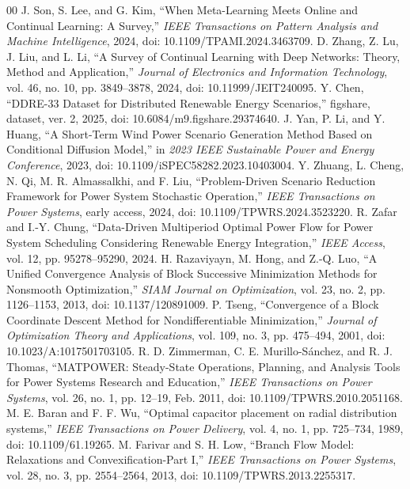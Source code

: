 \documentclass[journal]{IEEEtran}
\begin{document}
\begin{thebibliography}{00}
 J. Son, S. Lee, and G. Kim, ``When Meta-Learning Meets Online and Continual Learning: A Survey,'' \emph{IEEE Transactions on Pattern Analysis and Machine Intelligence}, 2024, doi: 10.1109/TPAMI.2024.3463709.
 D. Zhang, Z. Lu, J. Liu, and L. Li, ``A Survey of Continual Learning with Deep Networks: Theory, Method and Application,'' \emph{Journal of Electronics and Information Technology}, vol. 46, no. 10, pp. 3849--3878, 2024, doi: 10.11999/JEIT240095.
 Y. Chen, ``DDRE-33 Dataset for Distributed Renewable Energy Scenarios,'' figshare, dataset, ver. 2, 2025, doi: 10.6084/m9.figshare.29374640.
 J. Yan, P. Li, and Y. Huang, ``A Short-Term Wind Power Scenario Generation Method Based on Conditional Diffusion Model,'' in \emph{2023 IEEE Sustainable Power and Energy Conference}, 2023, doi: 10.1109/iSPEC58282.2023.10403004.
 Y. Zhuang, L. Cheng, N. Qi, M. R. Almassalkhi, and F. Liu, ``Problem-Driven Scenario Reduction Framework for Power System Stochastic Operation,'' \emph{IEEE Transactions on Power Systems}, early access, 2024, doi: 10.1109/TPWRS.2024.3523220.
 R. Zafar and I.-Y. Chung, ``Data-Driven Multiperiod Optimal Power Flow for Power System Scheduling Considering Renewable Energy Integration,'' \emph{IEEE Access}, vol. 12, pp. 95278--95290, 2024.
 H. Razaviyayn, M. Hong, and Z.-Q. Luo, ``A Unified Convergence Analysis of Block Successive Minimization Methods for Nonsmooth Optimization,'' \emph{SIAM Journal on Optimization}, vol. 23, no. 2, pp. 1126--1153, 2013, doi: 10.1137/120891009.
 P. Tseng, ``Convergence of a Block Coordinate Descent Method for Nondifferentiable Minimization,'' \emph{Journal of Optimization Theory and Applications}, vol. 109, no. 3, pp. 475--494, 2001, doi: 10.1023/A:1017501703105.
 R. D. Zimmerman, C. E. Murillo-S\'anchez, and R. J. Thomas, ``MATPOWER: Steady-State Operations, Planning, and Analysis Tools for Power Systems Research and Education,'' \emph{IEEE Transactions on Power Systems}, vol. 26, no. 1, pp. 12--19, Feb. 2011, doi: 10.1109/TPWRS.2010.2051168.
 M. E. Baran and F. F. Wu, ``Optimal capacitor placement on radial distribution systems,'' \emph{IEEE Transactions on Power Delivery}, vol. 4, no. 1, pp. 725--734, 1989, doi: 10.1109/61.19265.
 M. Farivar and S. H. Low, ``Branch Flow Model: Relaxations and Convexification-Part I,'' \emph{IEEE Transactions on Power Systems}, vol. 28, no. 3, pp. 2554--2564, 2013, doi: 10.1109/TPWRS.2013.2255317.
\end{thebibliography}
\end{document}
